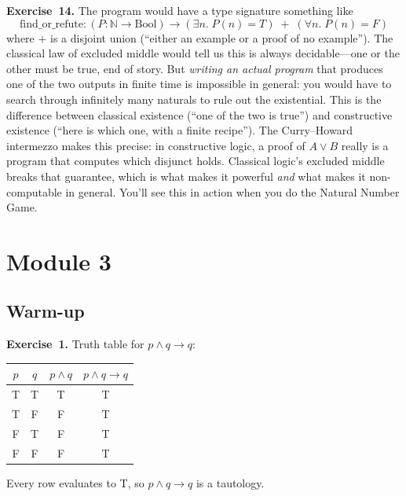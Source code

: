 \documentclass[11pt]{article}
\begin{document}
\medskip
\textbf{Exercise~14.}
The program would have a type signature something like
\[
  \text{find\_or\_refute} : (P : \mathbb{N} \to \text{Bool}) \to (\exists n.\; P(n) = T) \;+\; (\forall n.\; P(n) = F)
\]
where $+$ is a disjoint union (``either an example or a proof of no example''). The classical law of excluded middle would tell us this is always decidable---one or the other must be true, end of story. But \emph{writing an actual program} that produces one of the two outputs in finite time is impossible in general: you would have to search through infinitely many naturals to rule out the existential. This is the difference between classical existence (``one of the two is true'') and constructive existence (``here is which one, with a finite recipe''). The Curry--Howard intermezzo makes this precise: in constructive logic, a proof of $A \vee B$ really is a program that computes which disjunct holds. Classical logic's excluded middle breaks that guarantee, which is what makes it powerful \emph{and} what makes it non-computable in general. You'll see this in action when you do the Natural Number Game.

\section*{Module 3}

\subsection*{Warm-up}

\textbf{Exercise~1.}
Truth table for $p \wedge q \to q$:

\begin{center}
\begin{tabular}{cc|c|c}
\toprule
$p$ & $q$ & $p \wedge q$ & $p \wedge q \to q$ \\
\midrule
T & T & T & T \\
T & F & F & T \\
F & T & F & T \\
F & F & F & T \\
\bottomrule
\end{tabular}
\end{center}

Every row evaluates to T, so $p \wedge q \to q$ is a tautology.
\end{document}
